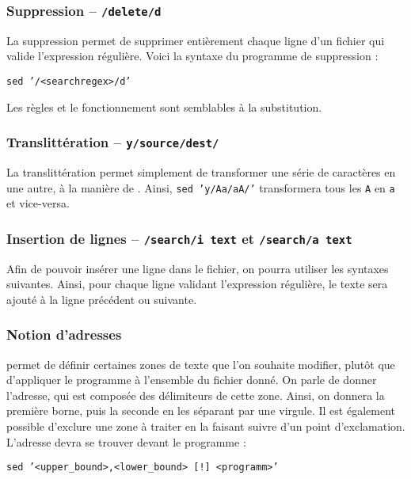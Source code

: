 \subsubsection{Suppression -- \texttt{/delete/d}}
La suppression permet de supprimer entièrement chaque ligne d'un fichier qui valide l'expression régulière. Voici la syntaxe du programme de suppression :
\begin{nscenter}
\texttt{sed '/<searchregex>/d'}
\end{nscenter}

Les règles et le fonctionnement sont semblables à la substitution.

\subsubsection{Translittération -- \texttt{y/source/dest/}}
La translittération permet simplement de transformer une série de caractères en une autre, à la manière de .
Ainsi, \texttt{sed 'y/Aa/aA/'} transformera tous les \texttt{A} en \texttt{a} et vice-versa.

\subsubsection{Insertion de lignes -- \texttt{/search/i text} et \texttt{/search/a text}}
Afin de pouvoir insérer une ligne dans le fichier, on pourra utiliser les syntaxes suivantes. Ainsi, pour chaque ligne validant l'expression régulière, le texte sera ajouté à la ligne précédent ou suivante.

\subsubsection{Notion d'adresses}

 permet de définir certaines zones de texte que l'on souhaite modifier, plutôt que d'appliquer le programme à l'ensemble du fichier donné. On parle de donner l'adresse, qui est composée des délimiteurs de cette zone. Ainsi, on donnera la première borne, puis la seconde en les séparant par une virgule. Il est également possible d'exclure une zone à traiter en la faisant suivre d'un point d'exclamation. L'adresse devra se trouver devant le programme  : 
\begin{nscenter}
\texttt{sed '<upper_bound>,<lower_bound> [!] <programm>'}
\end{nscenter}

